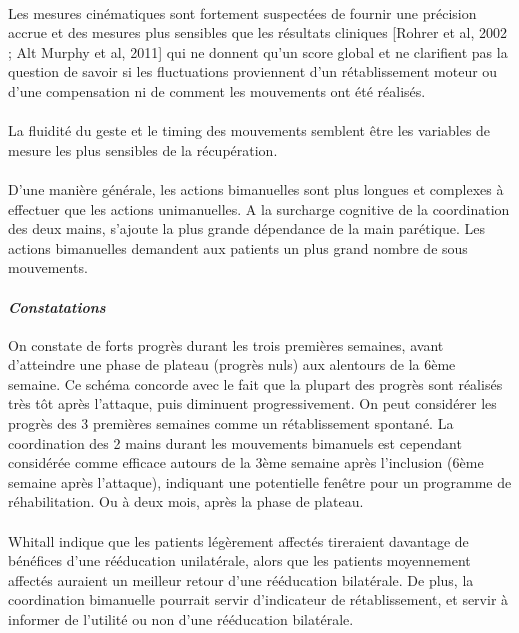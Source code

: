 \paragraph{}
Les mesures cinématiques sont fortement suspectées de fournir une précision accrue et des mesures plus sensibles que les résultats cliniques [Rohrer et al, 2002 ; Alt Murphy et al, 2011] qui ne donnent qu'un score global et ne clarifient pas la question de savoir si les fluctuations proviennent d'un rétablissement moteur ou d'une compensation ni de comment les mouvements ont été réalisés. 

\paragraph{}
La fluidité du geste et le timing des mouvements semblent être les variables de mesure les plus sensibles de la récupération.

\paragraph{}
D'une manière générale, les actions bimanuelles sont plus longues et complexes à effectuer que les actions unimanuelles. A la surcharge cognitive de la coordination des deux mains, s'ajoute la plus grande dépendance de la main parétique. Les actions bimanuelles demandent aux patients un plus grand nombre de sous mouvements. 

		\paragraph{\emph{Constatations}\\}
On constate de forts progrès durant les trois premières semaines, avant d'atteindre une phase de plateau (progrès nuls) aux alentours de la 6ème semaine. Ce schéma concorde avec le fait que la plupart des progrès sont réalisés très tôt après l'attaque, puis diminuent progressivement. On peut considérer les progrès des 3 premières semaines comme un rétablissement spontané. La coordination des 2 mains durant les mouvements bimanuels est cependant considérée comme efficace autours de la 3ème semaine après l'inclusion (6ème semaine après l'attaque), indiquant une potentielle fenêtre pour un programme de réhabilitation. Ou à deux mois, après la phase de plateau.		

\paragraph{}
Whitall \cite{Whit04} indique que les patients légèrement affectés tireraient davantage de bénéfices d'une rééducation unilatérale, alors que les patients moyennement affectés auraient un meilleur retour d'une rééducation bilatérale. De plus, la coordination bimanuelle pourrait servir d'indicateur de rétablissement, et servir à informer de l'utilité ou non d'une rééducation bilatérale.

